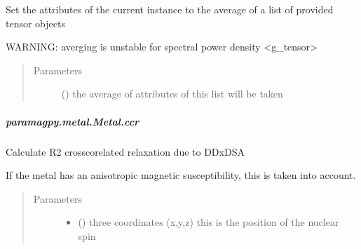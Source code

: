 \documentclass[a4paper,10pt,english,openany,oneside]{sphinxmanual}
\begin{document}
\begin{fulllineitems}
\begin{fulllineitems}
\begin{fulllineitems}
\label{\detokenize{reference/generated/paramagpy.metal.Metal.average:paramagpy.metal.Metal.average}}
\sphinxAtStartPar
Set the attributes of the current instance to the average
of a list of provided tensor objects

\sphinxAtStartPar
WARNING: averging is unstable for spectral power density \textless{}g\_tensor\textgreater{}
\begin{quote}\begin{description}
\item[{Parameters}] \leavevmode
\sphinxAtStartPar
{} () \textendash{} the average of attributes of this list will be taken

\end{description}\end{quote}

\end{fulllineitems}



\subparagraph{paramagpy.metal.Metal.ccr}
\label{\detokenize{reference/generated/paramagpy.metal.Metal.ccr:paramagpy-metal-metal-ccr}}\label{\detokenize{reference/generated/paramagpy.metal.Metal.ccr::doc}}

\begin{fulllineitems}
\label{\detokenize{reference/generated/paramagpy.metal.Metal.ccr:paramagpy.metal.Metal.ccr}}
\sphinxAtStartPar
Calculate R2 cross\sphinxhyphen{}corelated relaxation due to DDxDSA

\sphinxAtStartPar
If the metal has an anisotropic magnetic susceptibility, this is
taken into account.
\begin{quote}\begin{description}
\item[{Parameters}] \leavevmode\begin{itemize}
\item {} 
\sphinxAtStartPar
{} () \textendash{} three coordinates (x,y,z)
this is the position of the nuclear spin


\end{itemize}
\end{description}
\end{quote}
\end{fulllineitems}
\end{fulllineitems}
\end{fulllineitems}
\end{document}
